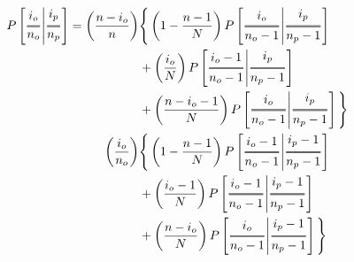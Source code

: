 \documentclass[preview]{standalone}
\newcommand{\Dfrac}[2]{%
  \ooalign{%
    $\genfrac{}{}{1.2pt}0{#1}{#2}$\cr%
    $\color{white}\genfrac{}{}{.4pt}0{\phantom{#1}}{\phantom{#2}}$}%
}
\newcommand{\cond}{\middle\vert}
\begin{document}
\begin{equation*}
  \begin{aligned}
    P\left[ \Dfrac{i_o}{n_o} \cond \Dfrac{i_p}{n_p} \right] = \left( \frac{n-i_o}{n} \right) 
    & \Bigg\{ \left( 1-\frac{n-1}{N}   \right)  P \left[ \Dfrac{i_o}{n_o-1}   \cond \Dfrac{i_p}{n_p-1} \right] \\
    & +       \left( \frac{i_o}{N} \right)      P \left[ \Dfrac{i_o-1}{n_o-1} \cond \Dfrac{i_p}{n_p-1} \right] \\
    & +       \left( \frac{n-i_o-1}{N} \right)  P \left[ \Dfrac{i_o}{n_o-1}   \cond \Dfrac{i_p}{n_p-1} \right] \Bigg\} \\
    \left( \frac{i_o}{n_o} \right) 
    & \Bigg\{  \left( 1 - \frac{n-1}{N} \right) P \left[ \Dfrac{i_o-1}{n_o-1} \cond \Dfrac{i_p-1}{n_p-1} \right] \\
    & +       \left( \frac{i_o-1}{N} \right)    P \left[ \Dfrac{i_o-1}{n_o-1} \cond \Dfrac{i_p-1}{ n_p-1} \right] \\
    & +       \left( \frac{n-i_o}{N} \right)    P \left[ \Dfrac{i_o}{n_o-1}   \cond \Dfrac{i_p-1}{n_p-1} \right] \Bigg\}
  \end{aligned}
\end{equation*}
\end{document}
